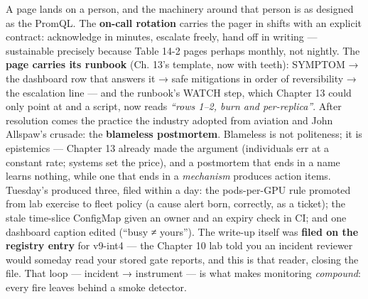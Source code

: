 A page lands on a person, and the machinery around that person is as designed as the PromQL. The \textbf{on-call rotation} carries the pager in shifts with an explicit contract: acknowledge in minutes, escalate freely, hand off in writing — sustainable precisely because Table 14-2 pages perhaps monthly, not nightly. The \textbf{page carries its runbook} (Ch. 13’s template, now with teeth): SYMPTOM → the dashboard row that answers it → safe mitigations in order of reversibility → the escalation line — and the runbook’s WATCH step, which Chapter 13 could only point at  and a script, now reads \textit{“rows 1–2, burn and per-replica”}. After resolution comes the practice the industry adopted from aviation and John Allspaw’s crusade: the \textbf{blameless postmortem}. Blameless is not politeness; it is epistemics — Chapter 13 already made the argument (individuals err at a constant rate; systems set the price), and a postmortem that ends in a name learns nothing, while one that ends in a \textit{mechanism} produces action items. Tuesday’s produced three, filed within a day: the pods-per-GPU rule promoted from lab exercise to fleet policy (a cause alert born, correctly, as a ticket); the stale time-slice ConfigMap given an owner and an expiry check in CI; and one dashboard caption edited (“busy ≠ yours”). The write-up itself was \textbf{filed on the registry entry} for v9-int4 — the Chapter 10 lab told you an incident reviewer would someday read your stored gate reports, and this is that reader, closing the file. That loop — incident → instrument — is what makes monitoring \textit{compound}: every fire leaves behind a smoke detector.

